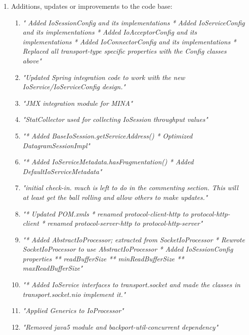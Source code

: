 \begin{enumerate}
    
    \item Additions, updates or improvements to the code base:
        
                \begin{enumerate}
                    \item \textit{" Added IoSessionConfig and its implementations
                    * Added IoServiceConfig and its implementations
                    * Added IoAcceptorConfig and its implementations
                    * Added IoConnectorConfig and its implementations
                    * Replaced all transport-type specific properties with the Config classes above"}
                    \item \textit{"Updated Spring integration code to work with the new IoService/IoServiceConfig design."}
                    \item \textit{"JMX integration module for MINA"}
                    \item \textit{"StatCollector used for collecting IoSession throughput values"}
                    \item \textit{"* Added BaseIoSession.getServiceAddress() * Optimized DatagramSessionImpl"}
                    \item \textit{"* Added IoServiceMetadata.hasFragmentation() * Added DefaultIoServiceMetadata"}
                    \item \textit{"initial check-in.  much is left to do in the commenting section.  This will at least get the ball rolling and allow others to make updates."}
                    \item \textit{"* Updated POM.xmls
                    * renamed protocol-client-http to protocol-http-client
                    * renamed protocol-server-http to protocol-http-server"}
                    \item \textit{"* Added AbstractIoProcessor; extracted from SocketIoProcessor
                    * Rewrote SocketIoProcessor to use AbstractIoProcessor
                    * Added IoSessionConfig properties
                    ** readBufferSize
                    ** minReadBufferSize
                    ** maxReadBufferSize"}
                    \item \textit{"* Added IoService interfaces to transport.socket and made the classes in transport.socket.nio implement it."}
                    \item \textit{"Applied Generics to IoProcessor"}
                    \item \textit{"Removed java5 module and backport-util-concurrent dependency"}
                \end{enumerate}
        

\end{enumerate}
